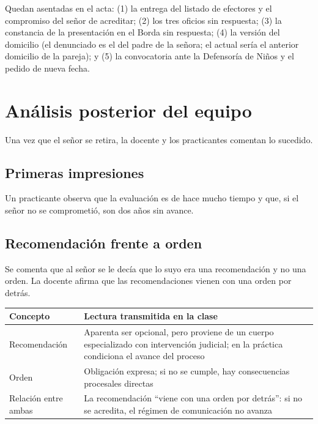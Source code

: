 \documentclass[12pt,oneside]{book}
\begin{document}
\begin{important}
Quedan asentadas en el acta: (1) la entrega del listado de efectores y el compromiso del se\~nor de acreditar; (2) los tres oficios sin respuesta; (3) la constancia de la presentaci\'on en el Borda sin respuesta; (4) la versi\'on del domicilio (el denunciado es el del padre de la se\~nora; el actual ser\'ia el anterior domicilio de la pareja); y (5) la convocatoria ante la Defensor\'ia de Ni\~nos y el pedido de nueva fecha.
\end{important}

\section{An\'alisis posterior del equipo}

Una vez que el se\~nor se retira, la docente y los practicantes comentan lo sucedido.

\subsection{Primeras impresiones}

Un practicante observa que la evaluaci\'on es de hace mucho tiempo y que, si el se\~nor no se comprometi\'o, son dos a\~nos sin avance.

\subsection{Recomendaci\'on frente a orden}

Se comenta que al se\~nor se le dec\'ia que lo suyo era una recomendaci\'on y no una orden. La docente afirma que las recomendaciones vienen con una orden por detr\'as.

\begin{table}[H]
\centering
\small
\begin{tabularx}{\textwidth}{>{\raggedright\arraybackslash}p{} >{\raggedright\arraybackslash}X}
\toprule
\textbf{Concepto} & \textbf{Lectura transmitida en la clase} \\
\midrule
Recomendaci\'on & Aparenta ser opcional, pero proviene de un cuerpo especializado con intervenci\'on judicial; en la pr\'actica condiciona el avance del proceso \\
Orden & Obligaci\'on expresa; si no se cumple, hay consecuencias procesales directas \\
Relaci\'on entre ambas & La recomendaci\'on ``viene con una orden por detr\'as'': si no se acredita, el r\'egimen de comunicaci\'on no avanza \\
\bottomrule
\end{tabularx}
\end{table}
\end{document}
